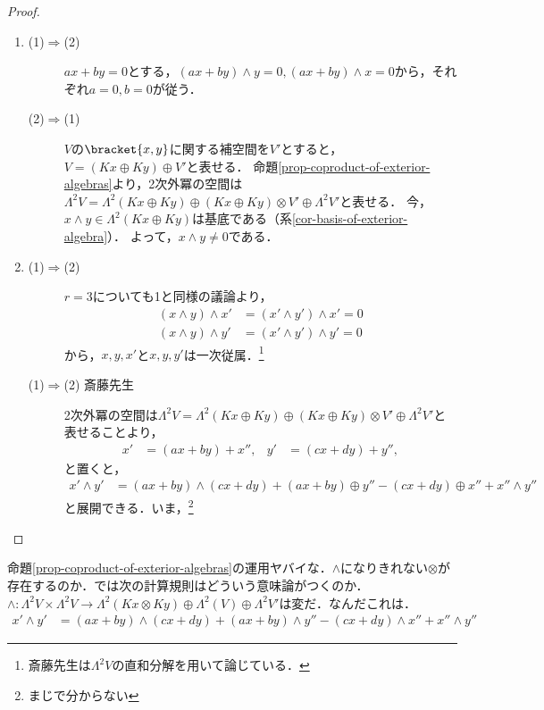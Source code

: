 \documentclass[uplatex, dvipdfmx]{jsreport}
\begin{document}
\begin{proof}\mbox{}
    \begin{enumerate}
        \item \begin{description}
            \item[(1)$\Rightarrow$(2)] $ax+by=0$とする，$(ax+by)\wedge y=0,(ax+by)\wedge x=0$から，それぞれ$a=0,b=0$が従う．
            \item[(2)$\Rightarrow$(1)] $V$の$\bracket{x,y}$に関する補空間を$V'$とすると，$V=(Kx\oplus Ky)\oplus V'$と表せる．
            命題\ref{prop-coproduct-of-exterior-algebras}より，2次外冪の空間は$\Lambda^2V=\Lambda^2(Kx\oplus Ky)\oplus(Kx\oplus Ky)\otimes V'\oplus\Lambda^2V'$と表せる．
            今，$x\wedge y\in\Lambda^2(Kx\oplus Ky)$は基底である（系\ref{cor-basis-of-exterior-algebra}）．
            よって，$x\wedge y\ne 0$である．
        \end{description}
        \item \begin{description}
            \item[(1)$\Rightarrow$(2)] $r=3$についても1と同様の議論より，
            \begin{align*}
                (x\wedge y)\wedge x'&=(x'\wedge y')\wedge x'=0\\
                (x\wedge y)\wedge y'&=(x'\wedge y')\wedge y'=0
            \end{align*}
            から，$x,y,x'$と$x,y,y'$は一次従属．\footnote{斎藤先生は$\Lambda^2V$の直和分解を用いて論じている．}
            \item[(1)$\Rightarrow$(2) 斎藤先生] 
            2次外冪の空間は$\Lambda^2V=\Lambda^2(Kx\oplus Ky)\oplus(Kx\oplus Ky)\otimes V'\oplus\Lambda^2V'$と表せることより，
            \begin{align*}
                x'&=(ax+by)+x'',&y'&=(cx+dy)+y'',
            \end{align*}
            と置くと，
            \begin{align*}
                x'\wedge y'&=(ax+by)\wedge(cx+dy)+(ax+by)\oplus y''-(cx+dy)\oplus x''+x''\wedge y''
            \end{align*}
            と展開できる．いま，\footnote{まじで分からない}
        \end{description}
    \end{enumerate}
\end{proof}
\begin{remarks}
    命題\ref{prop-coproduct-of-exterior-algebras}の運用ヤバイな．$\wedge$になりきれない$\otimes$が存在するのか．では次の計算規則はどういう意味論がつくのか．$\wedge:\Lambda^2V\times\Lambda^2V\to\Lambda^2(Kx\otimes Ky)\oplus\Lambda^2(V)\oplus\Lambda^2V'$は変だ．なんだこれは．
    \begin{align*}
        x'\wedge y'&=(ax+by)\wedge(cx+dy)+(ax+by)\wedge y''-(cx+dy)\wedge x''+x''\wedge y''
    \end{align*}
\end{remarks}
\end{document}
